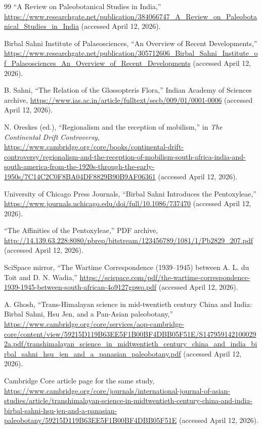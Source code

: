 \documentclass[10pt]{article}
\begin{document}
\begin{thebibliography}{99}
``A Review on Paleobotanical Studies in India,'' \url{https://www.researchgate.net/publication/384066747_A_Review_on_Paleobotanical_Studies_in_India} (accessed April 12, 2026).

Birbal Sahni Institute of Palaeosciences, ``An Overview of Recent Developments,'' \url{https://www.researchgate.net/publication/305712606_Birbal_Sahni_Institute_of_Palaeosciences_An_Overview_of_Recent_Developments} (accessed April 12, 2026).

B. Sahni, ``The Relation of the Glossopteris Flora,'' Indian Academy of Sciences archive, \url{https://www.ias.ac.in/article/fulltext/secb/009/01/0001-0006} (accessed April 12, 2026).

N. Oreskes (ed.), ``Regionalism and the reception of mobilism,'' in \textit{The Continental Drift Controversy}, \url{https://www.cambridge.org/core/books/continental-drift-controversy/regionalism-and-the-reception-of-mobilism-south-africa-india-and-south-america-from-the-1920s-through-the-early-1950s/7C14C2C0F8BA04DF8829B90B9AF06361} (accessed April 12, 2026).

University of Chicago Press Journals, ``Birbal Sahni Introduces the Pentoxyleae,'' \url{https://www.journals.uchicago.edu/doi/full/10.1086/737470} (accessed April 12, 2026).

``The Affinities of the Pentoxyleae,'' PDF archive, \url{http://14.139.63.228:8080/pbrep/bitstream/123456789/1081/1/Pb2829_207.pdf} (accessed April 12, 2026).

SciSpace mirror, ``The Wartime Correspondence (1939--1945) between A. L. du Toit and D. N. Wadia,'' \url{https://scispace.com/pdf/the-wartime-correspondence-1939-1945-between-south-african-4o9127gpwo.pdf} (accessed April 12, 2026).

A. Ghosh, ``Trans-Himalayan science in mid-twentieth century China and India: Birbal Sahni, Hsu Jen, and a Pan-Asian paleobotany,'' \url{https://www.cambridge.org/core/services/aop-cambridge-core/content/view/59215D119B63EE5F1B00BF4DBB05F51E/S1479591421000292a.pdf/transhimalayan_science_in_midtwentieth_century_china_and_india_birbal_sahni_hsu_jen_and_a_panasian_paleobotany.pdf} (accessed April 12, 2026).

Cambridge Core article page for the same study, \url{https://www.cambridge.org/core/journals/international-journal-of-asian-studies/article/transhimalayan-science-in-midtwentieth-century-china-and-india-birbal-sahni-hsu-jen-and-a-panasian-paleobotany/59215D119B63EE5F1B00BF4DBB05F51E} (accessed April 12, 2026).


\end{thebibliography}
\end{document}

